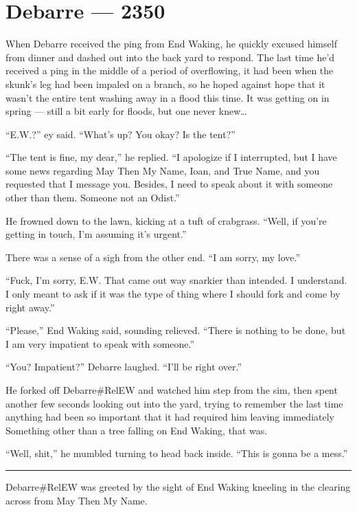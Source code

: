 \hypertarget{debarre-2350}{%
\chapter{Debarre — 2350}\label{debarre-2350}}

When Debarre received the ping from End Waking, he quickly excused himself from dinner and dashed out into the back yard to respond. The last time he'd received a ping in the middle of a period of overflowing, it had been when the skunk's leg had been impaled on a branch, so he hoped against hope that it wasn't the entire tent washing away in a flood this time. It was getting on in spring — still a bit early for floods, but one never knew\ldots{}

``E.W.?'' ey said. ``What's up? You okay? Is the tent?''

``The tent is fine, my dear,'' he replied. ``I apologize if I interrupted, but I have some news regarding May Then My Name, Ioan, and True Name, and you requested that I message you. Besides, I need to speak about it with someone other than them. Someone not an Odist.''

He frowned down to the lawn, kicking at a tuft of crabgrass. ``Well, if you're getting in touch, I'm assuming it's urgent.''

There was a sense of a sigh from the other end. ``I am sorry, my love.''

``Fuck, I'm sorry, E.W. That came out way snarkier than intended. I understand. I only meant to ask if it was the type of thing where I should fork and come by right away.''

``Please,'' End Waking said, sounding relieved. ``There is nothing to be done, but I am very impatient to speak with someone.''

``You? Impatient?'' Debarre laughed. ``I'll be right over.''

He forked off Debarre\#RelEW and watched him step from the sim, then spent another few seconds looking out into the yard, trying to remember the last time anything had been so important that it had required him leaving immediately Something other than a tree falling on End Waking, that was.

``Well, shit,'' he mumbled turning to head back inside. ``This is gonna be a mess.''

\begin{center}\rule{0.5\linewidth}{0.5pt}\end{center}

Debarre\#RelEW was greeted by the sight of End Waking kneeling in the clearing across from May Then My Name.

